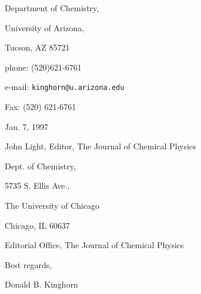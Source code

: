 \documentclass[12pt]{article}
\begin{document}
\begin{letterfrom}
\end{letterfrom}

\begin{letterfromcompany}
\end{letterfromcompany}

\begin{letterfromaddr}
Department of Chemistry,

University of Arizona,

Tucson, AZ 85721\newline

phone: (520)621-6761

e-mail: \texttt{kinghorn@u.arizona.edu}

Fax: (520) 621-6761
\end{letterfromaddr}

\begin{letterdate}
Jan. 7, 1997
\end{letterdate}

\begin{letterto}
\end{letterto}

\begin{lettertoaddr}
John Light, Editor, The Journal of Chemical Physics

Dept. of Chemistry,

5735 S. Ellis Ave.,

The University of Chicago

Chicago, IL 60637
\end{lettertoaddr}

\begin{letterattention}
Editorial Office, The Journal of Chemical Physics
\end{letterattention}

\begin{lettersubj}
\end{lettersubj}

\begin{letterclosing}
Best regards,
\end{letterclosing}

\begin{lettersign}
Donald B. Kinghorn
\end{lettersign}

\begin{letterps}
\end{letterps}

\begin{letterinitials}
\end{letterinitials}
\end{document}
